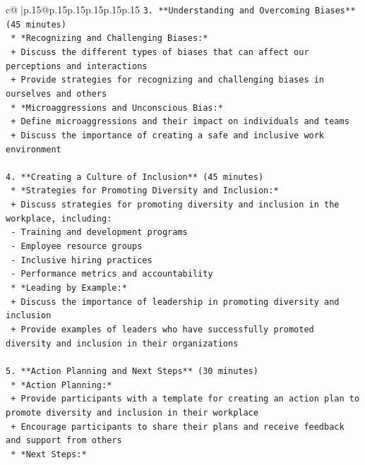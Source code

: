 \documentclass{article}
\begin{document}
{\begin{supertabular}{c@{$\;$}|p{.15\linewidth}@{}p{.15\linewidth}p{.15\linewidth}p{.15\linewidth}p{.15\linewidth}p{.15\linewidth}}
{{{\texttt{3. **Understanding and Overcoming Biases** (45 minutes)} \\
\texttt{   * *Recognizing and Challenging Biases:*} \\
\texttt{     + Discuss the different types of biases that can affect our perceptions and interactions} \\
\texttt{     + Provide strategies for recognizing and challenging biases in ourselves and others} \\
\texttt{   * *Microaggressions and Unconscious Bias:*} \\
\texttt{     + Define microaggressions and their impact on individuals and teams} \\
\texttt{     + Discuss the importance of creating a safe and inclusive work environment} \\
\\ 
\texttt{4. **Creating a Culture of Inclusion** (45 minutes)} \\
\texttt{   * *Strategies for Promoting Diversity and Inclusion:*} \\
\texttt{     + Discuss strategies for promoting diversity and inclusion in the workplace, including:} \\
\texttt{       {-} Training and development programs} \\
\texttt{       {-} Employee resource groups} \\
\texttt{       {-} Inclusive hiring practices} \\
\texttt{       {-} Performance metrics and accountability} \\
\texttt{   * *Leading by Example:*} \\
\texttt{     + Discuss the importance of leadership in promoting diversity and inclusion} \\
\texttt{     + Provide examples of leaders who have successfully promoted diversity and inclusion in their organizations} \\
\\ 
\texttt{5. **Action Planning and Next Steps** (30 minutes)} \\
\texttt{   * *Action Planning:*} \\
\texttt{     + Provide participants with a template for creating an action plan to promote diversity and inclusion in their workplace} \\
\texttt{     + Encourage participants to share their plans and receive feedback and support from others} \\
\texttt{   * *Next Steps:*} \\
}}}
\end{supertabular}}
\end{document}
